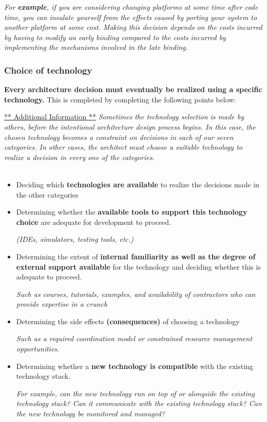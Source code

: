 \documentclass[a4paper]{article}
\begin{document}
\textit{For \textbf{example}, if you are considering changing platforms at some time after code time, you can insulate yourself from the effects caused by porting your system to another platform at some cost. Making this decision depends on the costs incurred by having to modify an early binding compared to the costs incurred by implementing the mechanisms involved in the late binding.}

\subsubsection{Choice of technology}

\textbf{Every architecture decision must eventually be realized using a specific technology.} This is completed by completing the following points below:

\underline{** Additional Information **}
\textit{Sometimes the technology selection is made by others, before the intentional architecture design process begins. In this case, the chosen technology becomes a constraint on decisions in each of our seven categories. In other cases, the architect must choose a suitable technology to realize a decision in every one of the categories.}\\\\

\begin{itemize}
\item Deciding which \textbf{technologies are available} to realize the decisions made in the other categories

\item Determining whether the \textbf{available tools to support this technology choice} are adequate for development to proceed.

\textit{(IDEs, simulators, testing tools, etc.)}

\item Determining the extent of \textbf{internal familiarity as well as the degree of external support available} for the technology and deciding whether this is adequate to proceed.

\textit{Such as courses, tutorials, examples, and availability of contractors who can provide expertise in a crunch}

\item Determining the side effects \textbf{(consequences)} of choosing a technology

\textit{Such as a required coordination model or constrained resource management opportunities.}

\item Determining whether a \textbf{new technology is compatible} with the existing technology stack. 

\textit{For example, can the new technology run on top of or alongside the existing technology stack? Can it communicate with the existing technology stack? Can the new technology be monitored and managed?}
\end{itemize}
\newpage
\end{document}
